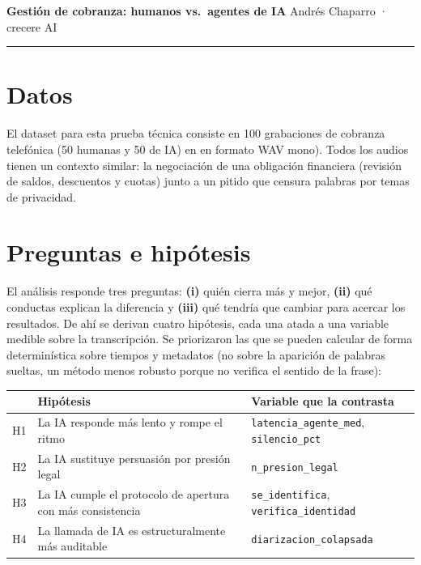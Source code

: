 \documentclass[10pt,a4paper]{article}
\begin{document}
{\large\bfseries Gestión de cobranza: humanos vs.\ agentes de IA}\hfill
{\small Andrés Chaparro · crecere AI}\\[-2pt]
\rule{\textwidth}{0.4pt}

\section{Datos}

El dataset para esta prueba técnica consiste en 100 grabaciones de cobranza telefónica (50 humanas y 50 de IA) en en formato WAV mono). Todos los audios tienen un contexto similar: la negociación de una obligación financiera (revisión de saldos, descuentos y cuotas) junto a un pitido que censura palabras por temas de privacidad.

\section{Preguntas e hipótesis}

El análisis responde tres preguntas: \textbf{(i)} quién cierra más y mejor, \textbf{(ii)} qué
conductas explican la diferencia y \textbf{(iii)} qué tendría que cambiar para acercar los
resultados. De ahí se derivan cuatro hipótesis, cada una atada a una variable medible sobre la
transcripción. Se priorizaron las que se pueden calcular de forma determinística sobre tiempos
y metadatos (no sobre la aparición de palabras sueltas, un método menos robusto porque no
verifica el sentido de la frase):

\begin{table}[h]
\centering\small
\vspace{-4pt}
\begin{tabular}{@{}clp{5.3cm}@{}}
\toprule
& Hipótesis & Variable que la contrasta \\
\midrule
H1 & La IA responde más lento y rompe el ritmo & \texttt{latencia\_agente\_med}, \texttt{silencio\_pct} \\
H2 & La IA sustituye persuasión por presión legal & \texttt{n\_presion\_legal} \\
H3 & La IA cumple el protocolo de apertura con más consistencia & \texttt{se\_identifica}, \texttt{verifica\_identidad} \\
H4 & La llamada de IA es estructuralmente más auditable & \texttt{diarizacion\_colapsada} \\
\bottomrule
\end{tabular}
\end{table}
\vspace{-10pt}
\end{document}
